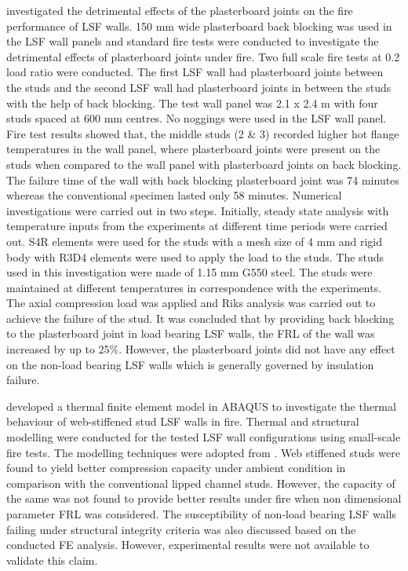 \citet{Ariyanayagam2016} investigated the detrimental effects of the plasterboard joints on the fire performance of LSF walls. 150 mm wide plasterboard back blocking was used in the LSF wall panels and standard fire tests were conducted to investigate the detrimental effects of plasterboard joints under fire. Two full scale fire tests at 0.2 load ratio were conducted. The first LSF wall had plasterboard joints between the studs and the second LSF wall had plasterboard joints in between the studs with the help of back blocking. The test wall panel was 2.1 x 2.4 m with four studs spaced at 600 mm centres. No noggings were used in the LSF wall panel. Fire test results showed that, the middle studs (2 \& 3) recorded higher hot flange temperatures in the wall panel, where plasterboard joints were present on the studs when compared to the wall panel with plasterboard joints on back blocking. The failure time of the wall with back blocking plasterboard joint was 74 minutes whereas the conventional specimen lasted only 58 minutes. Numerical investigations were carried out in two steps. Initially, steady state analysis with temperature inputs from the experiments at different time periods were carried out. S4R elements were used for the studs with a mesh size of 4 mm and rigid body with R3D4 elements were used to apply the load to the studs. The studs used in this investigation were made of 1.15 mm G550 steel. The studs were maintained at different temperatures in correspondence with the experiments. The axial compression load was applied and Riks analysis was carried out to achieve the failure of the stud. It was concluded that by providing back blocking to the plasterboard joint in load bearing LSF walls, the FRL of the wall was increased by up to 25\%. However, the plasterboard joints did not have any effect on the non-load bearing LSF walls which is generally governed by insulation failure.

\citet{Dias2018} developed a thermal finite element model in ABAQUS to investigate the thermal behaviour of web-stiffened stud LSF walls in fire. Thermal and structural modelling were conducted for the tested LSF wall configurations using small-scale fire tests. The modelling techniques were adopted from \citet{Rusthi2017}. Web stiffened studs were found to yield better compression capacity under ambient condition in comparison with the conventional lipped channel studs. However, the capacity of the same was not found to provide better results under fire when non dimensional parameter FRL was considered. The susceptibility of non-load bearing LSF walls failing under structural integrity criteria was also discussed based on the conducted FE analysis. However, experimental results were not available to validate this claim. 

